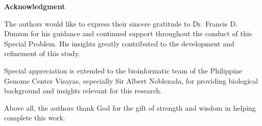 
\begin{center}
\textbf{Acknowledgment}
\end{center}

The authors would like to express their sincere gratitude to Dr. Francis D. Dimzon for his guidance and continued support throughout the conduct of this Special Problem. His insights greatly contributed to the development and refinement of this study.

Special appreciation is extended to the bioinformatic team of the Philippine Genome Center Visayas, especially Sir Albert Noblezada, for providing biological background and insights relevant for this research.


Above all, the authors thank God for the gift of strength and wisdom in helping complete this work. 